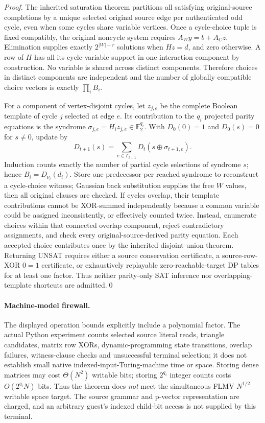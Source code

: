 \documentclass[11pt]{article}
\newcommand{\F}{\mathbb F_2}
\begin{document}
\begin{proof}
The inherited saturation theorem partitions all satisfying original-source completions by a unique selected original source edge per authenticated odd cycle, even when some cycles share variable vertices. Once a cycle-choice tuple is fixed compatibly, the original noncycle system requires $A_Wy=b+A_Cz$. Elimination supplies exactly $2^{|W|-r}$ solutions when $Hz=d$, and zero otherwise. A row of $H$ has all its cycle-variable support in one interaction component by construction. No variable is shared across distinct components. Therefore choices in distinct components are independent and the number of globally compatible choice vectors is exactly $\prod_iB_i$.

For a component of vertex-disjoint cycles, let $z_{j,e}$ be the complete Boolean template of cycle $j$ selected at edge $e$. Its contribution to the $q_i$ projected parity equations is the syndrome $\sigma_{j,e}=H_i z_{j,e}\in\F^{q_i}$. With $D_0(0)=1$ and $D_0(s)=0$ for $s\ne0$, update by
\[
 D_{t+1}(s)=\sum_{e\in\Gamma_{t+1}} D_t(s\oplus\sigma_{t+1,e}).
\]
Induction counts exactly the number of partial cycle selections of syndrome $s$; hence $B_i=D_{\nu_i}(d_i)$. Store one predecessor per reached syndrome to reconstruct a cycle-choice witness; Gaussian back substitution supplies the free $W$ values, then all original clauses are checked. If cycles overlap, their template contributions cannot be XOR-summed independently because a common variable could be assigned inconsistently, or effectively counted twice. Instead, enumerate choices within that connected overlap component, reject contradictory assignments, and check every original-source-derived parity equation. Each accepted choice contributes once by the inherited disjoint-union theorem. Returning UNSAT requires either a source conservation certificate, a source-row-XOR $0=1$ certificate, or exhaustively replayable zero-reachable-target DP tables for at least one factor. Thus neither parity-only SAT inference nor overlapping-template shortcuts are admitted.\qed
\end{proof}

\paragraph{Machine-model firewall.}
The displayed operation bounds explicitly include a polynomial factor. The actual Python experiment counts selected source literal reads, triangle candidates, matrix row XORs, dynamic-programming state transitions, overlap failures, witness-clause checks and unsuccessful terminal selection; it does not establish small native indexed-input-Turing-machine time or space. Storing dense matrices may cost $\Theta(N^2)$ writable bits; storing $2^{q_i}$ integer counts costs $O(2^{q_i}N)$ bits. Thus the theorem does \emph{not} meet the simultaneous FLMV $N^{1/2}$ writable space target. The source grammar and p-vector representation are charged, and an arbitrary guest's indexed child-bit access is not supplied by this terminal.
\end{document}

